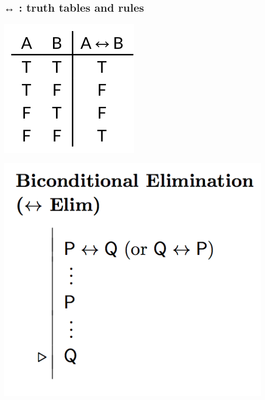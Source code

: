 \documentclass[12pt]{extarticle}
\begin{document}
\begin{multicols*}{3}
 
\section{↔ : truth tables and rules}
 
\begin{center}
\includegraphics[scale=0.3]{img/tt_biconditional.png}
\end{center}
\begin{center}
\includegraphics[scale=0.3]{img/rule_biconditional_elim.png}
\end{center}
\begin{center}

\end{center}
\end{multicols*}
\end{document}
